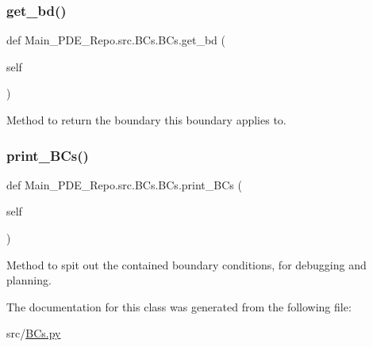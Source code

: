 \subsubsection{\texorpdfstring{get\+\_\+bd()}{get\_bd()}}
{\footnotesize\ttfamily def Main\+\_\+\+P\+D\+E\+\_\+\+Repo.\+src.\+B\+Cs.\+B\+Cs.\+get\+\_\+bd (\begin{DoxyParamCaption}\item[{}]{self }\end{DoxyParamCaption})}



Method to return the boundary this boundary applies to. 

\mbox{\label{classMain__PDE__Repo_1_1src_1_1BCs_1_1BCs_a77a1acda2d5b7301ac5ef3a883daffe2}} 
\subsubsection{\texorpdfstring{print\+\_\+\+B\+Cs()}{print\_BCs()}}
{\footnotesize\ttfamily def Main\+\_\+\+P\+D\+E\+\_\+\+Repo.\+src.\+B\+Cs.\+B\+Cs.\+print\+\_\+\+B\+Cs (\begin{DoxyParamCaption}\item[{}]{self }\end{DoxyParamCaption})}



Method to spit out the contained boundary conditions, for debugging and planning. 



The documentation for this class was generated from the following file\+:\begin{DoxyCompactItemize}
\item 
src/\hyperlink{BCs_8py}{B\+Cs.\+py}\end{DoxyCompactItemize}
